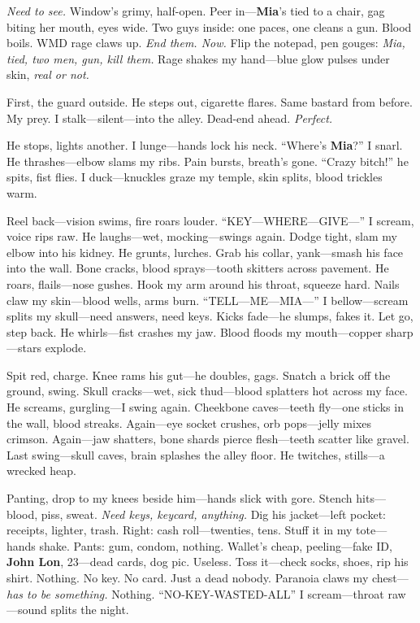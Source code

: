 \documentclass{article}
\begin{document}
\textit{Need to see.} Window’s grimy, half-open. Peer in—\textbf{Mia}’s tied to a chair, gag biting her mouth, eyes wide. Two guys inside: one paces, one cleans a gun. Blood boils. WMD rage claws up. \textit{End them. Now.} Flip the notepad, pen gouges: \textit{Mia, tied, two men, gun, kill them.} Rage shakes my hand—blue glow pulses under skin, \textit{real or not.}

First, the guard outside. He steps out, cigarette flares. Same bastard from before. My prey. I stalk—silent—into the alley. Dead-end ahead. \textit{Perfect.}

He stops, lights another. I lunge—hands lock his neck. “Where’s \textbf{Mia}?” I snarl. He thrashes—elbow slams my ribs. Pain bursts, breath’s gone. “Crazy bitch!” he spits, fist flies. I duck—knuckles graze my temple, skin splits, blood trickles warm.

Reel back—vision swims, fire roars louder. “KEY—WHERE—GIVE—” I scream, voice rips raw. He laughs—wet, mocking—swings again. Dodge tight, slam my elbow into his kidney. He grunts, lurches. Grab his collar, yank—smash his face into the wall. Bone cracks, blood sprays—tooth skitters across pavement. He roars, flails—nose gushes. Hook my arm around his throat, squeeze hard. Nails claw my skin—blood wells, arms burn. “TELL—ME—MIA—” I bellow—scream splits my skull—need answers, need keys. Kicks fade—he slumps, fakes it. Let go, step back. He whirls—fist crashes my jaw. Blood floods my mouth—copper sharp—stars explode.

Spit red, charge. Knee rams his gut—he doubles, gags. Snatch a brick off the ground, swing. Skull cracks—wet, sick thud—blood splatters hot across my face. He screams, gurgling—I swing again. Cheekbone caves—teeth fly—one sticks in the wall, blood streaks. Again—eye socket crushes, orb pops—jelly mixes crimson. Again—jaw shatters, bone shards pierce flesh—teeth scatter like gravel. Last swing—skull caves, brain splashes the alley floor. He twitches, stills—a wrecked heap.

Panting, drop to my knees beside him—hands slick with gore. Stench hits—blood, piss, sweat. \textit{Need keys, keycard, anything.} Dig his jacket—left pocket: receipts, lighter, trash. Right: cash roll—twenties, tens. Stuff it in my tote—hands shake. Pants: gum, condom, nothing. Wallet’s cheap, peeling—fake ID, \textbf{John Lon}, 23—dead cards, dog pic. Useless. Toss it—check socks, shoes, rip his shirt. Nothing. No key. No card. Just a dead nobody. Paranoia claws my chest—\textit{has to be something.} Nothing. “NO-KEY-WASTED-ALL” I scream—throat raw—sound splits the night.
\end{document}
